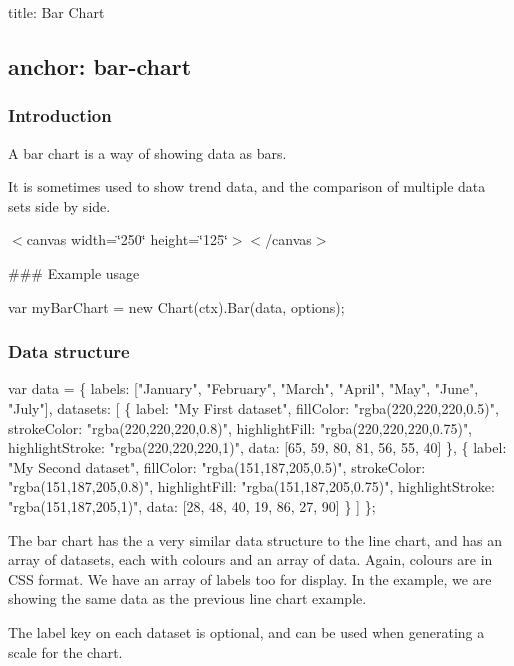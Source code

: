 

 title\+: Bar Chart \subsection*{anchor\+: bar-\/chart }

\subsubsection*{Introduction}

A bar chart is a way of showing data as bars.

It is sometimes used to show trend data, and the comparison of multiple data sets side by side.

 $<$canvas width=\char`\"{}250\char`\"{} height=\char`\"{}125\char`\"{}$>$$<$/canvas$>$ 

\#\#\# Example usage 
\begin{DoxyCode}
var myBarChart = new Chart(ctx).Bar(data, options);
\end{DoxyCode}


\subsubsection*{Data structure}


\begin{DoxyCode}
var data = \{
    labels: ["January", "February", "March", "April", "May", "June", "July"],
    datasets: [
        \{
            label: "My First dataset",
            fillColor: "rgba(220,220,220,0.5)",
            strokeColor: "rgba(220,220,220,0.8)",
            highlightFill: "rgba(220,220,220,0.75)",
            highlightStroke: "rgba(220,220,220,1)",
            data: [65, 59, 80, 81, 56, 55, 40]
        \},
        \{
            label: "My Second dataset",
            fillColor: "rgba(151,187,205,0.5)",
            strokeColor: "rgba(151,187,205,0.8)",
            highlightFill: "rgba(151,187,205,0.75)",
            highlightStroke: "rgba(151,187,205,1)",
            data: [28, 48, 40, 19, 86, 27, 90]
        \}
    ]
\};
\end{DoxyCode}
 The bar chart has the a very similar data structure to the line chart, and has an array of datasets, each with colours and an array of data. Again, colours are in C\+SS format. We have an array of labels too for display. In the example, we are showing the same data as the previous line chart example.

The label key on each dataset is optional, and can be used when generating a scale for the chart.

